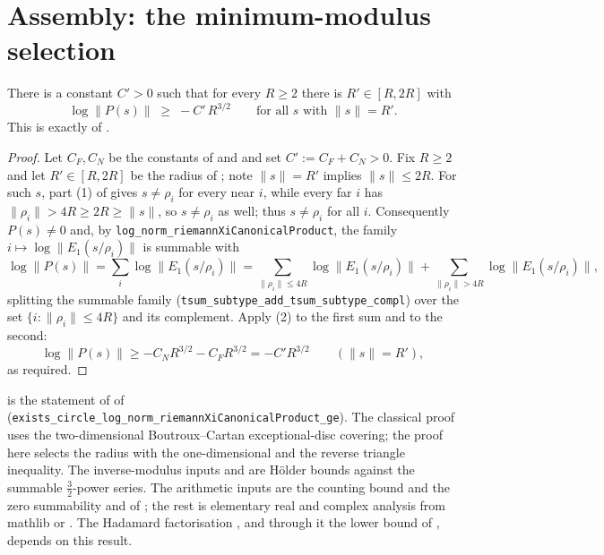 \section{Assembly: the minimum-modulus selection}
\label{sec:cm_main}

\begin{theorem}
\label{thm:cm_minmod}
\leanok
{}
There is a constant $C'>0$ such that for every $R\ge2$ there is $R'\in[R,2R]$ with
\[
  \log\|P(s)\|\;\ge\;-C'\,R^{3/2}\qquad\text{for all }s\text{ with }\|s\|=R'.
\]
This is exactly  of .
\end{theorem}

\begin{proof}
\leanok
{}
Let $C_F,C_N$ be the constants of  and  and set
$C':=C_F+C_N>0$. Fix $R\ge2$ and let $R'\in[R,2R]$ be the radius of ;
note $\|s\|=R'$ implies $\|s\|\le2R$. For such $s$, part (1) of  gives
$s\neq\rho_i$ for every near $i$, while every far $i$ has $\|\rho_i\|>4R\ge2R\ge\|s\|$, so
$s\neq\rho_i$ as well; thus $s\neq\rho_i$ for all $i$. Consequently $P(s)\neq0$ and, by
\texttt{log\_norm\_riemannXiCanonicalProduct}, the family $i\mapsto\log\|E_1(s/\rho_i)\|$ is
summable with
\[
  \log\|P(s)\|=\sum_i\log\|E_1(s/\rho_i)\|
   =\sum_{\|\rho_i\|\le4R}\log\|E_1(s/\rho_i)\|+\sum_{\|\rho_i\|>4R}\log\|E_1(s/\rho_i)\|,
\]
splitting the summable family (\texttt{tsum\_subtype\_add\_tsum\_subtype\_compl}) over the set
$\{i:\|\rho_i\|\le4R\}$ and its complement. Apply (2) to the first sum
and  to the second:
\[
  \log\|P(s)\|\ge-C_NR^{3/2}-C_FR^{3/2}=-C'R^{3/2}\qquad(\|s\|=R'),
\]
as required.
\end{proof}

\begin{remark}
 is the statement of  of 
(\texttt{exists\_circle\_log\_norm\_riemannXiCanonicalProduct\_ge}). The classical proof uses the
two-dimensional Boutroux–Cartan exceptional-disc covering; the proof here selects the radius with
the one-dimensional  and the reverse triangle inequality. The
inverse-modulus inputs  and  are Hölder bounds
against the summable $\tfrac32$-power series. The arithmetic inputs are the counting bound
 and the zero summability  and
 of ; the rest is elementary real and
complex analysis from mathlib or . The Hadamard factorisation
, and through it the lower bound  of
, depends on this result.
\end{remark}
